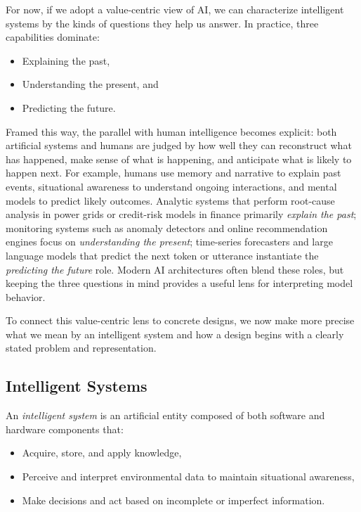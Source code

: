 For now, if we adopt a value-centric view of AI, we can characterize intelligent systems by the kinds of questions they help us answer. In practice, three capabilities dominate:
\begin{itemize}
    \item Explaining the past,
    \item Understanding the present, and
    \item Predicting the future.
\end{itemize}
Framed this way, the parallel with human intelligence becomes explicit: both artificial systems and humans are judged by how well they can reconstruct what has happened, make sense of what is happening, and anticipate what is likely to happen next. For example, humans use memory and narrative to explain past events, situational awareness to understand ongoing interactions, and mental models to predict likely outcomes. Analytic systems that perform root-cause analysis in power grids or credit-risk models in finance primarily \emph{explain the past}; monitoring systems such as anomaly detectors and online recommendation engines focus on \emph{understanding the present}; time-series forecasters and large language models that predict the next token or utterance instantiate the \emph{predicting the future} role. Modern AI architectures often blend these roles, but keeping the three questions in mind provides a useful lens for interpreting model behavior.

To connect this value-centric lens to concrete designs, we now make more precise what we mean by an intelligent system and how a design begins with a clearly stated problem and representation.

\subsection{Intelligent Systems}\label{sec:intro_intelligent_systems}

An \emph{intelligent system} is an artificial entity composed of both software and hardware components that:
\begin{itemize}
    \item Acquire, store, and apply knowledge,
    \item Perceive and interpret environmental data to maintain situational awareness,
    \item Make decisions and act based on incomplete or imperfect information.
\end{itemize}

